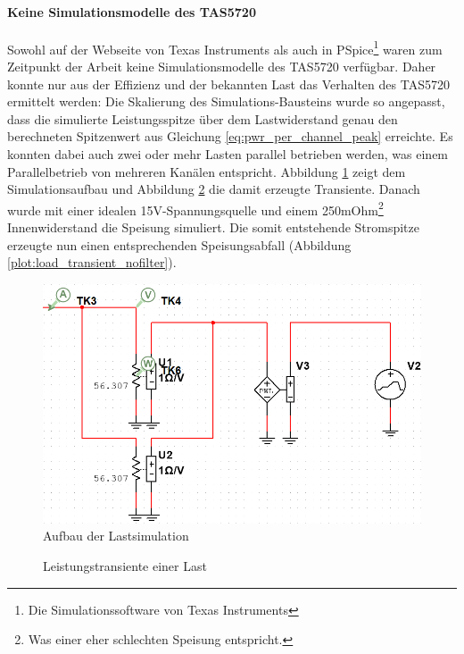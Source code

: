 \paragraph{Keine Simulationsmodelle des TAS5720}Sowohl auf der Webseite von Texas Instruments als auch in PSpice\footnote{Die Simulationssoftware von Texas Instruments} waren zum Zeitpunkt der Arbeit keine Simulationsmodelle des TAS5720 verfügbar. Daher konnte nur aus der Effizienz und der bekannten Last das Verhalten des TAS5720 ermittelt werden: Die Skalierung des Simulations-Bausteins wurde so angepasst, dass die simulierte Leistungsspitze über dem Lastwiderstand genau den berechneten Spitzenwert aus Gleichung \ref{eq:pwr_per_channel_peak} erreichte. Es konnten dabei auch zwei oder mehr Lasten parallel betrieben werden, was einem Parallelbetrieb von mehreren Kanälen entspricht. Abbildung \ref{pic:simulation_load} zeigt dem Simulationsaufbau und Abbildung \ref{plot:load_transient} die damit erzeugte Transiente.
Danach wurde mit einer idealen 15V-Spannungsquelle und einem 250mOhm\footnote{Was einer eher schlechten Speisung entspricht.} Innenwiderstand die Speisung simuliert. Die somit entstehende Stromspitze erzeugte nun einen entsprechenden Speisungsabfall (Abbildung \ref{plot:load_transient_nofilter}).
\begin{figure}[H]
	\centering
	\includegraphics[width=\textwidth*6/8]{pictures/simu_load.png}
	\caption{Aufbau der Lastsimulation}
	\label{pic:simulation_load}
\end{figure}
\begin{figure}[H]
	\centering
	\caption{Leistungstransiente einer Last}
	\label{plot:load_transient}
\end{figure}
